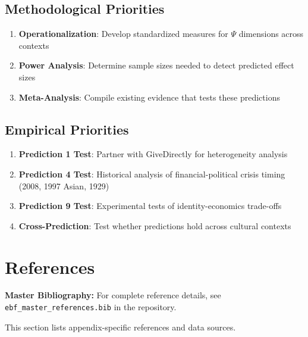 \subsection{Methodological Priorities}

\begin{enumerate}
    \item \textbf{Operationalization}: Develop standardized measures for $\Psi$ dimensions across contexts
    \item \textbf{Power Analysis}: Determine sample sizes needed to detect predicted effect sizes
    \item \textbf{Meta-Analysis}: Compile existing evidence that tests these predictions
\end{enumerate}

\subsection{Empirical Priorities}

\begin{enumerate}
    \item \textbf{Prediction 1 Test}: Partner with GiveDirectly for heterogeneity analysis
    \item \textbf{Prediction 4 Test}: Historical analysis of financial-political crisis timing (2008, 1997 Asian, 1929)
    \item \textbf{Prediction 9 Test}: Experimental tests of identity-economics trade-offs
    \item \textbf{Cross-Prediction}: Test whether predictions hold across cultural contexts
\end{enumerate}


\section{References}

\nocite{bcm_master}

\label{sec:S-references}

\begin{tcolorbox}[colback=blue!5!white, colframe=blue!75!black]
\textbf{Master Bibliography:} For complete reference details, see
\texttt{ebf\_master\_references.bib} in the repository.

This section lists appendix-specific references and data sources.
\end{tcolorbox}

